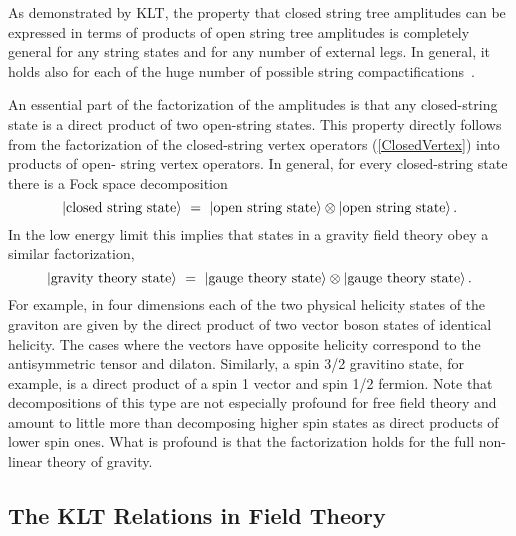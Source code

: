 As demonstrated by KLT, the property that closed string tree amplitudes
can be expressed in terms of products of open string tree amplitudes
is completely general for any string states and for any number of
external legs. In general, it holds also for each of the huge number
of possible string
compactifications~\cite{Narain86,Narain87,Dixon85,Dixon86,Kawai87,
Antoniadis87}.

 An essential part of the factorization of the amplitudes
is that any closed-string state is a direct product of two open-string
states.  This property directly follows from the factorization of the
closed-string vertex operators (\ref{ClosedVertex}) into products of open-
string vertex operators.  In general, for every closed-string
state there is a Fock space decomposition
%
\begin{equation}
\vert \hbox{closed string state} \rangle
\ =\ \vert  \hbox{open string state} \rangle 
\otimes \vert\hbox{open string state} \rangle \,.
\end{equation}
%
In the low energy limit this implies that states in a gravity field
theory obey a similar factorization, 
%
\begin{equation}
\vert \hbox{gravity theory state} \rangle
\ =\ \vert  \hbox{gauge theory state} \rangle 
\otimes \vert\hbox{gauge theory state} \rangle \,.
\label{StateFactorization}
\end{equation}
%
For example, in four dimensions each of the two physical helicity
states of the graviton are given by the direct product of two vector
boson states of identical helicity. The cases where the vectors have
opposite helicity correspond to the antisymmetric tensor and dilaton.
Similarly, a spin 3/2 gravitino state, for example, is a direct product
of a spin 1 vector and spin 1/2 fermion.  Note that decompositions of
this type are not especially profound for free field theory and
amount to little more than decomposing higher spin states as direct
products of lower spin ones.  What is profound is that the
factorization holds for the full non-linear theory of gravity.

\subsection{The KLT Relations in Field Theory}

